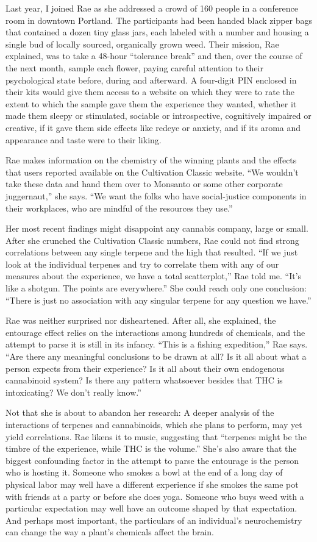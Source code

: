 Last year, I joined Rae as she addressed a crowd of 160 people in a
conference room in downtown Portland. The participants had been handed
black zipper bags that contained a dozen tiny glass jars, each labeled
with a number and housing a single bud of locally sourced, organically
grown weed. Their mission, Rae explained, was to take a 48-hour
``tolerance break'' and then, over the course of the next month, sample
each flower, paying careful attention to their psychological state
before, during and afterward. A four-digit PIN enclosed in their kits
would give them access to a website on which they were to rate the
extent to which the sample gave them the experience they wanted, whether
it made them sleepy or stimulated, sociable or introspective,
cognitively impaired or creative, if it gave them side effects like
redeye or anxiety, and if its aroma and appearance and taste were to
their liking.

Rae makes information on the chemistry of the winning plants and the
effects that users reported available on the Cultivation Classic
website. ``We wouldn't take these data and hand them over to Monsanto or
some other corporate juggernaut,'' she says. ``We want the folks who
have social-justice components in their workplaces, who are mindful of
the resources they use.''

Her most recent findings might disappoint any cannabis company, large or
small. After she crunched the Cultivation Classic numbers, Rae could not
find strong correlations between any single terpene and the high that
resulted. ``If we just look at the individual terpenes and try to
correlate them with any of our measures about the experience, we have a
total scatterplot,'' Rae told me. ``It's like a shotgun. The points are
everywhere.'' She could reach only one conclusion: ``There is just no
association with any singular terpene for any question we have.''

Rae was neither surprised nor disheartened. After all, she explained,
the entourage effect relies on the interactions among hundreds of
chemicals, and the attempt to parse it is still in its infancy. ``This
is a fishing expedition,'' Rae says. ``Are there any meaningful
conclusions to be drawn at all? Is it all about what a person expects
from their experience? Is it all about their own endogenous cannabinoid
system? Is there any pattern whatsoever besides that THC is
intoxicating? We don't really know.''

Not that she is about to abandon her research: A deeper analysis of the
interactions of terpenes and cannabinoids, which she plans to perform,
may yet yield correlations. Rae likens it to music, suggesting that
``terpenes might be the timbre of the experience, while THC is the
volume.'' She's also aware that the biggest confounding factor in the
attempt to parse the entourage is the person who is hosting it. Someone
who smokes a bowl at the end of a long day of physical labor may well
have a different experience if she smokes the same pot with friends at a
party or before she does yoga. Someone who buys weed with a particular
expectation may well have an outcome shaped by that expectation. And
perhaps most important, the particulars of an individual's
neurochemistry can change the way a plant's chemicals affect the brain.

